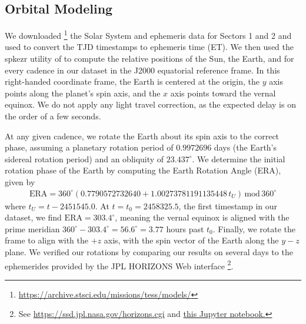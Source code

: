 \documentclass[modern]{aastex62}
\begin{document}
\subsection{Orbital Modeling}%
\label{sec:orbit}%
%
We downloaded%
\footnote{\url{https://archive.stsci.edu/missions/tess/models/}}
the Solar System and \TESS ephemeris data for
Sectors 1 and 2 and used \spiceypy \citep{Acton1996, Acton2017, Annex2017}
to convert the TJD timestamps to 
ephemeris time (ET). We then used the \textsf{spkezr} utility of \spiceypy to compute
the relative positions of the Sun, the Earth, and \TESS for every cadence
in our dataset in the J2000 equatorial reference frame. In this right-handed
coordinate frame, the Earth is centered at the origin, the $y$ axis points along the 
planet's spin axis, and the $x$ axis points toward the vernal equinox. We
do not apply any light travel correction, as the expected delay is on the order
of a few seconds.

At any given cadence, we rotate the Earth about its spin axis to the correct phase,
assuming a planetary rotation period of $0.9972696$ days (the Earth's sidereal 
rotation period) and an obliquity
of $23.437^\circ$. We determine the initial rotation
phase of the Earth by computing the Earth Rotation Angle (ERA), given by \citep{Urban2013}
%
\begin{align}
\mathrm{ERA} = 360^\circ(0.7790572732640 + 1.00273781191135448 \, t_U) \, \mathrm{mod} \, 360^\circ
\end{align}
%
where $t_U = t - 2451545.0$. At $t = t_0 = 2458325.5$, the first timestamp in our dataset,
we find $\mathrm{ERA} = 303.4^\circ$, meaning the vernal equinox is aligned with
the prime meridian $360^\circ - 303.4^\circ = 56.6^\circ = 3.77$ hours past $t_0$.
%
Finally, we rotate the frame to align
\TESS with the $+z$ axis, with the spin vector of the Earth along the $y-z$ plane.
We verified our rotations by comparing our results on several days to the
ephemerides provided by the JPL HORIZONS Web interface%
\footnote{See \url{https://ssd.jpl.nasa.gov/horizons.cgi} and 
\href{https://github.com/rodluger/earthshine/blob/master/notebooks/SanityCheck.ipynb}{this
Jupyter notebook.}}.
\end{document}
